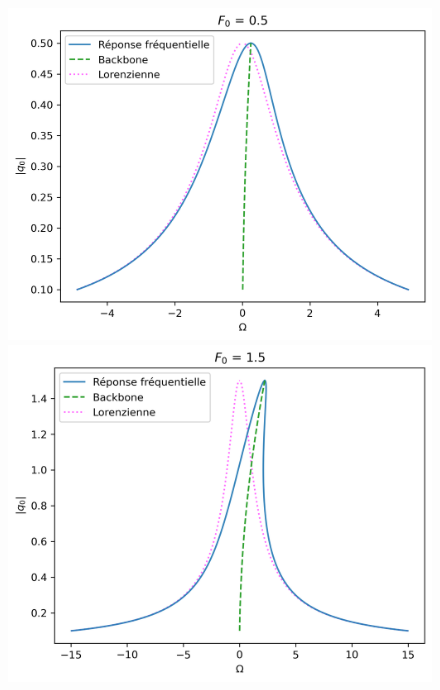 \begin{figure}[!b]
    
    \begin{subcaptionblock}{.31\linewidth}
      \includegraphics[width=\linewidth]{images/duffing/F0=0.5.png}%
    \end{subcaptionblock}
    \begin{subcaptionblock}{.31\linewidth}
      \includegraphics[width=\linewidth]{images/duffing/F0=1.5.png}%
    \end{subcaptionblock}
    \begin{subcaptionblock}{.31\linewidth}

\end{subcaptionblock}
\end{figure}
